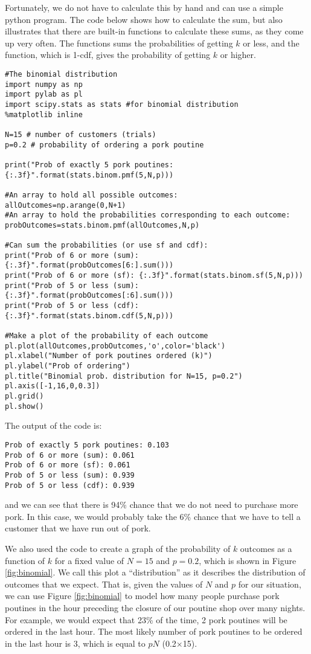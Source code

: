 Fortunately, we do not have to calculate this by hand and can use a simple python program. The code below shows how to calculate the sum, but also illustrates that there are built-in functions to calculate these sums, as they come up very often. The  functions sums the probabilities of getting $k$ or less, and the  function, which is 1-cdf, gives the probability of getting $k$ or higher.
\begin{lstlisting}[frame=single] 
#The binomial distribution
import numpy as np
import pylab as pl
import scipy.stats as stats #for binomial distribution
%matplotlib inline

N=15 # number of customers (trials)
p=0.2 # probability of ordering a pork poutine

print("Prob of exactly 5 pork poutines: {:.3f}".format(stats.binom.pmf(5,N,p)))

#An array to hold all possible outcomes:
allOutcomes=np.arange(0,N+1)
#An array to hold the probabilities corresponding to each outcome:
probOutcomes=stats.binom.pmf(allOutcomes,N,p)

#Can sum the probabilities (or use sf and cdf):
print("Prob of 6 or more (sum): {:.3f}".format(probOutcomes[6:].sum()))
print("Prob of 6 or more (sf): {:.3f}".format(stats.binom.sf(5,N,p)))
print("Prob of 5 or less (sum): {:.3f}".format(probOutcomes[:6].sum()))
print("Prob of 5 or less (cdf): {:.3f}".format(stats.binom.cdf(5,N,p)))

#Make a plot of the probability of each outcome
pl.plot(allOutcomes,probOutcomes,'o',color='black')
pl.xlabel("Number of pork poutines ordered (k)")
pl.ylabel("Prob of ordering")
pl.title("Binomial prob. distribution for N=15, p=0.2")
pl.axis([-1,16,0,0.3])
pl.grid()
pl.show()
\end{lstlisting}
The output of the code is:
\begin{verbatim}
Prob of exactly 5 pork poutines: 0.103
Prob of 6 or more (sum): 0.061
Prob of 6 or more (sf): 0.061
Prob of 5 or less (sum): 0.939
Prob of 5 or less (cdf): 0.939
\end{verbatim}
and we can see that there is 94\% chance that we do not need to purchase more pork. In this case, we would probably take the 6\% chance that we have to tell a customer that we have run out of pork.

We also used the code to create a graph of the probability of $k$ outcomes as a function of $k$ for a fixed value of $N=15$ and $p=0.2$, which is shown in Figure \ref{fig:binomial}. We call this plot a ``distribution'' as it describes the distribution of outcomes that we expect. That is, given the values of $N$ and $p$ for our situation, we can use Figure \ref{fig:binomial} to model how many people purchase pork poutines in the hour preceding the closure of our poutine shop over many nights. For example, we would expect that 23\% of the time, 2 pork poutines will be ordered in the last hour. The most likely number of pork poutines to be ordered in the last hour is 3, which is equal to $pN$ (0.2$\times$15).

